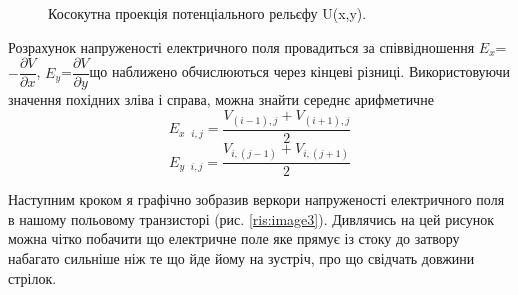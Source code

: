 \documentclass[14pt,a4paper]{scrartcl}
\begin{document}
\begin{figure}
\caption{Косокутна проекція потенціального рельєфу U(x,y).}
\label{ris:image2}
\end{figure}

\newpage

Розрахунок напруженості електричного поля провадиться за співвідношення $E_x$=$-\dfrac{\partial V}{\partial x}$, $E_y$=$\dfrac{\partial V}{\partial y}$що наближено обчислюються через кінцеві різниці. Використовуючи значення похідних зліва і справа, можна знайти середнє арифметичне
\begin{equation}
E_{x\text{ }i,j} = \dfrac{V_{(i-1),j}  + V_{(i+1),j}}{2}
\label{eq:ref}
\end{equation}
\begin{equation}
E_{y\text{ }i,j} = \dfrac{V_{i,(j-1)}  + V_{i,(j+1)}}{2}
\label{eq:ref}
\end{equation}











Наступним кроком я графічно зобразив веркори напруженості електричного поля в нашому польовому транзисторі (рис. \ref{ris:image3}). Дивлячись на цей рисунок можна чітко побачити що електричне поле яке прямує із стоку до затвору набагато сильніше ніж те що йде йому на зустріч, про що свідчать довжини стрілок.\\
\end{document}
